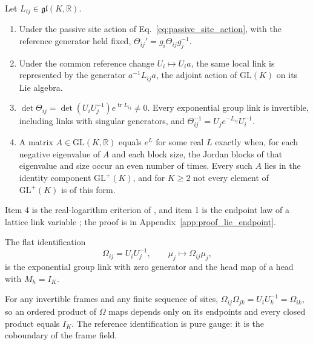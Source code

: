 \documentclass[twoside,11pt]{article}
\begin{document}
\begin{proposition}
\label{prop:lie_endpoint}
Let $L_{ij}\in\mathfrak{gl}(K,\mathbb R)$.
\begin{enumerate}
\item Under the passive site action of Eq.~\eqref{eq:passive_site_action}, with the reference generator held fixed, $\Theta_{ij}'=g_i\Theta_{ij}g_j^{-1}$.
\item Under the common reference change $U_i\mapsto U_ia$, the same local link is represented by the generator $a^{-1}L_{ij}a$, the adjoint action of $\mathrm{GL}(K)$ on its Lie algebra.
\item $\det\Theta_{ij}=\det(U_iU_j^{-1})e^{\operatorname{tr}L_{ij}}\ne0$. Every exponential group link is invertible, including links with singular generators, and $\Theta_{ij}^{-1}=U_je^{-L_{ij}}U_i^{-1}$.
\item A matrix $A\in\mathrm{GL}(K,\mathbb R)$ equals $e^{L}$ for some real $L$ exactly when, for each negative eigenvalue of $A$ and each block size, the Jordan blocks of that eigenvalue and size occur an even number of times. Every such $A$ lies in the identity component $\mathrm{GL}^+(K)$, and for $K\ge2$ not every element of $\mathrm{GL}^+(K)$ is of this form.
\end{enumerate}
\end{proposition}
Item 4 is the real-logarithm criterion of \citet{culver1966existence}, and item 1 is the endpoint law of a lattice link variable \citep{WilsonConfinement1974,Kogut1979RMP,Creutz1983}; the proof is in Appendix~\ref{app:proof_lie_endpoint}.

The flat identification
\begin{equation}
\Omega_{ij}=U_iU_j^{-1},\qquad
\mu_j\mapsto\Omega_{ij}\mu_j,
\label{eq:gauge_frame_rotation}
\end{equation}
is the exponential group link with zero generator and the head map of a head with $M_h=I_K$.
\begin{remark}
\label{rem:flat_identification}
For any invertible frames and any finite sequence of sites, $\Omega_{ij}\Omega_{jk}=U_iU_k^{-1}=\Omega_{ik}$, so an ordered product of $\Omega$ maps depends only on its endpoints and every closed product equals $I_K$. The reference identification is pure gauge: it is the coboundary of the frame field.
\end{remark}
\end{document}
